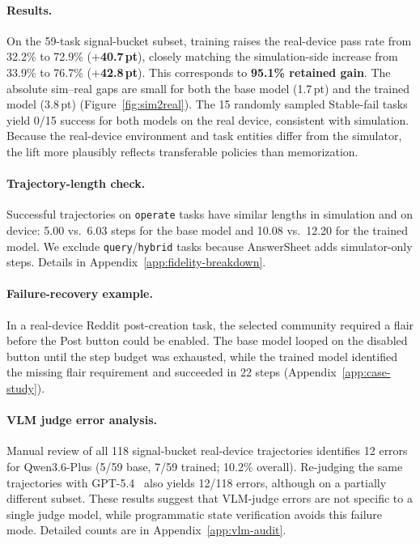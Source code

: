\documentclass{llmxive}
\begin{document}
\paragraph{Results.} On the 59-task signal-bucket subset, training raises the real-device pass rate from 32.2\% to 72.9\% (\textbf{$+$40.7\,pt}), closely matching the simulation-side increase from 33.9\% to 76.7\% (\textbf{$+$42.8\,pt}). This corresponds to \textbf{95.1\% retained gain}. The absolute sim--real gaps are small for both the base model (1.7\,pt) and the trained model (3.8\,pt) (Figure~\ref{fig:sim2real}). The 15 randomly sampled Stable-fail tasks yield 0/15 success for both models on the real device, consistent with simulation. Because the real-device environment and task entities differ from the simulator, the lift more plausibly reflects transferable policies than memorization.

\paragraph{Trajectory-length check.} Successful trajectories on \texttt{operate} tasks have similar lengths in simulation and on device: 5.00 vs.\ 6.03 steps for the base model and 10.08 vs.\ 12.20 for the trained model. We exclude \texttt{query}/\texttt{hybrid} tasks because AnswerSheet adds simulator-only steps. Details in Appendix~\ref{app:fidelity-breakdown}.

\paragraph{Failure-recovery example.} In a real-device Reddit post-creation task, the selected community required a flair before the Post button could be enabled. The base model looped on the disabled button until the step budget was exhausted, while the trained model identified the missing flair requirement and succeeded in 22 steps (Appendix~\ref{app:case-study}).

\paragraph{VLM judge error analysis.} Manual review of all 118 signal-bucket real-device trajectories identifies 12 errors for Qwen3.6-Plus (5/59 base, 7/59 trained; 10.2\% overall). Re-judging the same trajectories with GPT-5.4~\cite{GPT54} also yields 12/118 errors, although on a partially different subset. These results suggest that VLM-judge errors are not specific to a single judge model, while programmatic state verification avoids this failure mode. Detailed counts are in Appendix~\ref{app:vlm-audit}.
\end{document}
